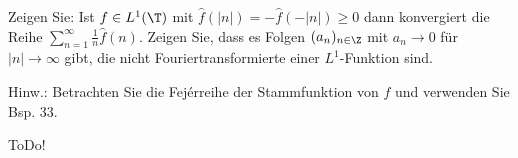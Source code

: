 
\begin{exercise}

Zeigen Sie:
Ist $f \in L^1(\T)$ mit $\hat f(|n|) = - \hat f(-|n|) \geq 0$ dann konvergiert die Reihe $\sum_{n=1}^\infty \frac{1}{n} \hat f(n)$.
Zeigen Sie, dass es Folgen $(a_n)_{n \in \Z}$ mit $a_n \to 0$ für $|n| \to \infty$ gibt, die nicht Fouriertransformierte einer $L^1$-Funktion sind.

Hinw.:
Betrachten Sie die Fejérreihe der Stammfunktion von $f$ und verwenden Sie Bsp. 33.

\end{exercise}


\begin{solution}

ToDo!

\end{solution}

